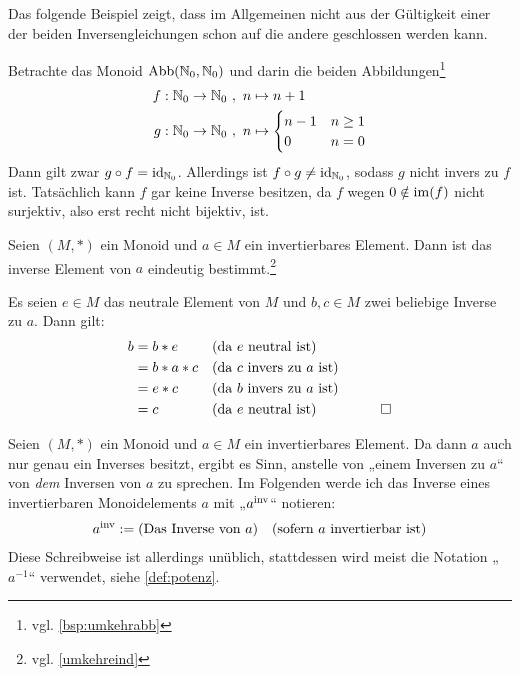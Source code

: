 \begin{bsp}[*]
    Das folgende Beispiel zeigt, dass im Allgemeinen nicht aus der Gültigkeit einer der beiden Inversengleichungen schon auf die andere geschlossen werden kann.
    
    Betrachte das Monoid $\operatorname{Abb}(\mathbb N_0,\mathbb N_0)$ und darin die beiden Abbildungen\footnote{vgl. \cref{bsp:umkehrabb}}
    \begin{align*}
        f : \mathbb N_0 \to \mathbb N_0 \ &,\ n \mapsto n+1 \\
        g: \mathbb N_0 \to \mathbb N_0 \ &,\ n\mapsto \begin{cases}
            n-1 & n\ge 1 \\
            0 & n=0
        \end{cases}
    \end{align*}
    Dann gilt zwar $g\circ f=\mathrm{id}_{\mathbb N_0}$. Allerdings ist $f\circ g\neq \mathrm{id}_{\mathbb N_0}$, sodass $g$ nicht invers zu $f$ ist. Tatsächlich kann $f$ gar keine Inverse besitzen, da $f$ wegen $0\notin \operatorname{im}(f)$ nicht surjektiv, also erst recht nicht bijektiv, ist.
\end{bsp}


\begin{satz} \label{inveind}
    Seien $(M,*)$ ein Monoid und $a\in M$ ein invertierbares Element. Dann ist das inverse Element von $a$ eindeutig bestimmt.\footnote{vgl. \cref{umkehreind}}
\end{satz}
 
 
\begin{bew}
    Es seien $e\in M$ das neutrale Element von $M$ und $b,c\in M$ zwei beliebige Inverse zu $a$. Dann gilt:
    \begin{align*}
        b & = b*e && (\text{da $e$ neutral ist}) \\
        & = b* a*c && (\text{da $c$ invers zu $a$ ist}) \\
        & = e*c && (\text{da $b$ invers zu $a$ ist}) \\
        & = c && (\text{da $e$ neutral ist}) &\qed
    \end{align*}
\end{bew}


\begin{nota}
    Seien $(M,*)$ ein Monoid und $a\in M$ ein invertierbares Element. Da dann $a$ auch nur genau ein Inverses besitzt, ergibt es Sinn, anstelle von „einem Inversen zu $a$“ von \emph{dem} Inversen von $a$ zu sprechen. Im Folgenden werde ich das Inverse eines invertierbaren Monoidelements $a$ mit „$a^{\mathrm{inv}}$“ notieren:
    \begin{align*}
         a^{\mathrm{inv}} := (\text{Das Inverse von $a$}) && (\text{sofern $a$ invertierbar ist})
    \end{align*}
    Diese Schreibweise ist allerdings unüblich, stattdessen wird meist die Notation „$a^{-1}$“ verwendet, siehe \cref{def:potenz}.
\end{nota}


